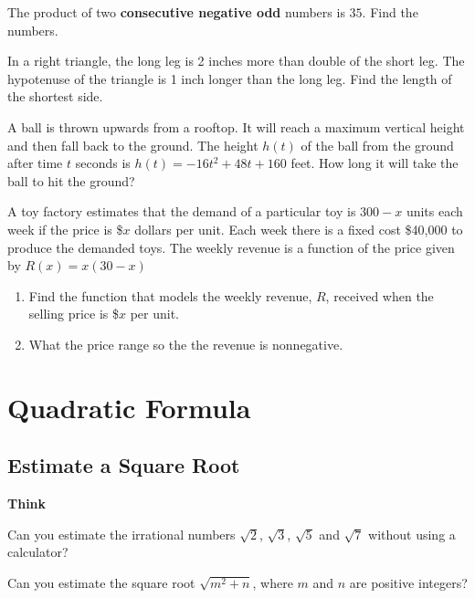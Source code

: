 \documentclass[en,12pt]{elegantbook}
\providecommand{\tightlist}{%
  \setlength{\itemsep}{0pt}\setlength{\parskip}{0pt}}
\newenvironment{rmdthink}{
	\par\noindent
	{
		\makebox[-\width][r]{
			\footnotesize
			\color{green!90}\faLightbulbO
			\hspace*{3pt}
		}
			\textbf{
				\color{second}
				Think 
			}
    }
    \begin{shaded}
    \sffamily
}{
    \par\medskip\ignorespacesafterend
    \end{shaded}
}
\providecommand{\tightlist}{%
  \setlength{\itemsep}{0pt}\setlength{\parskip}{0pt}}
\let\BeginKnitrBlock\begin \let\EndKnitrBlock\end
\begin{document}
\BeginKnitrBlock{exercise}
\protect\hypertarget{exr:unnamed-chunk-121}{}{\label{exr:unnamed-chunk-121} }
The product of two \textbf{consecutive negative odd} numbers is \(35\). Find the numbers.
\EndKnitrBlock{exercise}

\BeginKnitrBlock{exercise}
\protect\hypertarget{exr:unnamed-chunk-122}{}{\label{exr:unnamed-chunk-122} }
In a right triangle, the long leg is 2 inches more than double of the short leg. The hypotenuse of the triangle is 1 inch longer than the long leg. Find the length of the shortest side.
\EndKnitrBlock{exercise}

\BeginKnitrBlock{exercise}
\protect\hypertarget{exr:unnamed-chunk-123}{}{\label{exr:unnamed-chunk-123} }
A ball is thrown upwards from a rooftop. It will reach a maximum vertical height and then fall back to the ground. The height \(h(t)\) of the ball from the ground after time \(t\) seconds is \(h(t)=-16t^2 + 48t + 160\) feet. How long it will take the ball to hit the ground?
\EndKnitrBlock{exercise}

\BeginKnitrBlock{exercise}
\protect\hypertarget{exr:unnamed-chunk-124}{}{\label{exr:unnamed-chunk-124} }
A toy factory estimates that the demand of a particular toy is \(300 -x\) units each week if the price is \$\(x\) dollars per unit. Each week there is a fixed cost \$40,000 to produce the demanded toys.
The weekly revenue is a function of the price given by \(R(x)=x(30-x)\)

\begin{enumerate}
\def\labelenumi{\arabic{enumi}.}
\tightlist
\item
  Find the function that models the weekly revenue, \(R\), received when the selling price is \$\(x\) per unit.
\item
  What the price range so the the revenue is nonnegative.
\end{enumerate}
\EndKnitrBlock{exercise}

\hypertarget{quadratic-formula}{%
\chapter{Quadratic Formula}\label{quadratic-formula}}

\hypertarget{estimate-a-square-root}{%
\section{Estimate a Square Root}\label{estimate-a-square-root}}

\begin{rmdthink}

Can you estimate the irrational numbers \(\sqrt{2}\), \(\sqrt{3}\), \(\sqrt{5}\) and \(\sqrt{7}\) without using a calculator?

Can you estimate the square root \(\sqrt{m^2+n}\), where \(m\) and \(n\) are positive integers?

\end{rmdthink}
\end{document}
